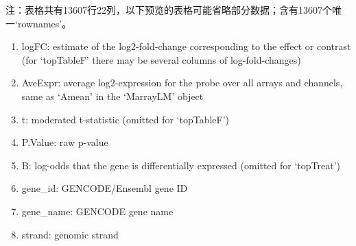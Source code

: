 \documentclass[
]{article}
\providecommand{\tightlist}{%
  \setlength{\itemsep}{0pt}\setlength{\parskip}{0pt}}
\begin{document}
\begin{center}\begin{tcolorbox}[colback=gray!10, colframe=gray!50, width=0.9\linewidth, arc=1mm, boxrule=0.5pt]注：表格共有13607行22列，以下预览的表格可能省略部分数据；含有13607个唯一`rownames'。
\end{tcolorbox}
\end{center}
\begin{center}\begin{tcolorbox}[colback=gray!10, colframe=gray!50, width=0.9\linewidth, arc=1mm, boxrule=0.5pt]\begin{enumerate}\tightlist
\item logFC:  estimate of the log2-fold-change corresponding to the effect or contrast (for ‘topTableF’ there may be several columns of log-fold-changes)
\item AveExpr:  average log2-expression for the probe over all arrays and channels, same as ‘Amean’ in the ‘MarrayLM’ object
\item t:  moderated t-statistic (omitted for ‘topTableF’)
\item P.Value:  raw p-value
\item B:  log-odds that the gene is differentially expressed (omitted for ‘topTreat’)
\item gene\_id:  GENCODE/Ensembl gene ID
\item gene\_name:  GENCODE gene name
\item strand:  genomic strand
\end{enumerate}\end{tcolorbox}
\end{center}
\end{document}
